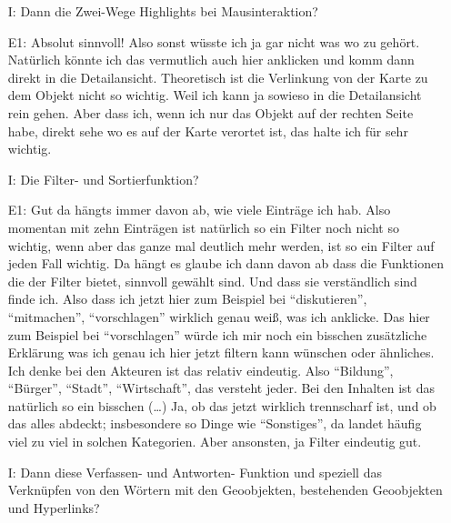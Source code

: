 \begin{itemize}
    \item[I:] Dann die Zwei-Wege Highlights bei Mausinteraktion?
    \item[E1:] Absolut sinnvoll! Also sonst w{\"u}sste ich ja gar nicht was wo zu geh{\"o}rt. Nat{\"u}rlich k{\"o}nnte ich das vermutlich auch hier anklicken und komm dann direkt in die Detailansicht. Theoretisch ist die Verlinkung von der Karte zu dem Objekt nicht so wichtig. Weil ich kann ja sowieso in die Detailansicht rein gehen. Aber dass ich, wenn ich nur das Objekt auf der rechten Seite habe, direkt sehe wo es auf der Karte verortet ist, das halte ich f{\"u}r sehr wichtig.
    \item[I:] Die Filter- und Sortierfunktion?
    \item[E1:] Gut da h{\"a}ngts immer davon ab, wie viele Eintr{\"a}ge ich hab. Also momentan mit zehn Eintr{\"a}gen ist nat{\"u}rlich so ein Filter noch nicht so wichtig, wenn aber das ganze mal deutlich mehr werden, ist so ein Filter auf jeden Fall wichtig. Da h{\"a}ngt es glaube ich dann davon ab dass die Funktionen die der Filter bietet, sinnvoll gew{\"a}hlt sind. Und dass sie verst{\"a}ndlich sind finde ich. Also dass ich jetzt hier zum Beispiel bei "`diskutieren"', "`mitmachen"', "`vorschlagen"' wirklich genau wei{\ss}, was ich anklicke. Das hier zum Beispiel bei "`vorschlagen"' w{\"u}rde ich mir noch ein bisschen zus{\"a}tzliche Erkl{\"a}rung was ich genau ich hier jetzt filtern kann w{\"u}nschen oder {\"a}hnliches. Ich denke bei den Akteuren ist das relativ eindeutig. Also "`Bildung"', "`B{\"u}rger"', "`Stadt"', "`Wirtschaft"', das versteht jeder. Bei den Inhalten ist das nat{\"u}rlich so ein bisschen (\dots) Ja, ob das jetzt wirklich trennscharf ist, und ob das alles abdeckt; insbesondere so Dinge wie "`Sonstiges"', da landet h{\"a}ufig viel zu viel in solchen Kategorien. Aber ansonsten, ja Filter eindeutig gut.
    \item[I:] Dann diese Verfassen- und Antworten- Funktion und speziell das Verkn{\"u}pfen von den W{\"o}rtern mit den Geoobjekten, bestehenden Geoobjekten und Hyperlinks?

\end{itemize}
